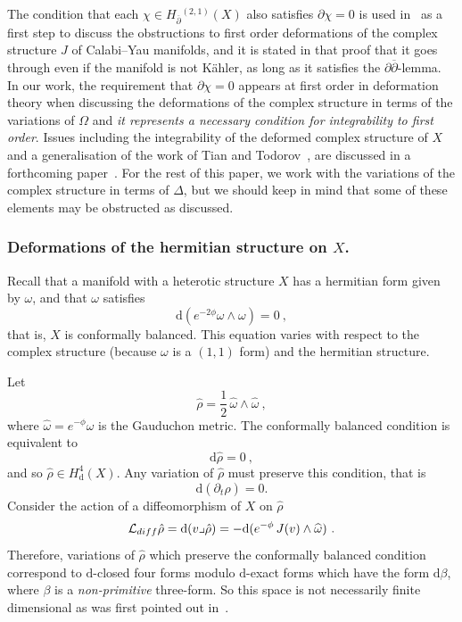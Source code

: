 \documentclass[12pt,a4paper]{article}
\newcommand{\half}{\frac{1}{2}}
\def\bar#1{\overline{#1}}
\let\p=\partial
\def\d{\textrm{d}}
\def\bp{\bar{\partial}}
\theoremstyle{definition}
\begin{document}
The condition that each $\chi\in H_{\bp}{}^{(2,1)}(X)$ also satisfies $\p\chi=0$ is used  in~\citep{MR915841} as a first step to discuss the obstructions to first order deformations of the complex structure $J$ of Calabi--Yau manifolds, and it is stated in that proof that it goes through even if  the manifold is not  K\"ahler, as long as it satisfies the $\p\bp$-lemma.  In our work, the requirement that $\p\chi=0$ appears at first order in deformation theory when discussing the deformations of the complex structure in terms of the variations of $\Omega$ and {\it it represents a necessary condition for integrability to first order}.  Issues including  the integrability of the deformed complex structure of $X$ and a generalisation of the work of Tian and Todorov~\cite{MR915841,MR1027500}, are  discussed in a forthcoming paper~\citep{DKS2014}.  For the rest of this paper, we work with the variations of the complex structure in terms of $\Delta$, but we should keep in mind that some of these elements may be obstructed as discussed.


\subsubsection{Deformations of the hermitian structure on \texorpdfstring{$X$}\ .}
\label{subsubsec:defHS}

Recall that a manifold with a heterotic structure $X$ has a hermitian form given by $\omega$, and that $\omega$ satisfies
\[ \d (e^{-2\phi}\omega\wedge\omega) = 0~,\]
that is, $X$ is conformally balanced.  This equation varies with respect to the complex structure (because $\omega$ is a $(1,1)$ form) and the hermitian structure. 

Let
\[\hat\rho = \half\, \widehat\omega\wedge\widehat\omega~,\]
where $\widehat\omega = e^{-\phi}\omega$ is the Gauduchon metric.
The conformally balanced condition is equivalent to
\[\d \hat\rho = 0~,\]
and so $\hat\rho\in H_\d^4(X)$. Any variation of $\hat\rho$ must preserve this condition, that is
\[ \d (\partial_t\hat\rho) = 0.\]
Consider the action of  a diffeomorphism of $X$ on $\hat\rho$
\[{\cal L}_{diff} \hat\rho = \d (v\lrcorner\hat\rho) = - \d( e^{-\phi} \, J(v)\wedge\widehat\omega)~.\]
Therefore, variations of $\hat\rho$ which preserve the conformally balanced condition correspond to $\d$-closed four forms modulo 
$\d$-exact forms which have the form $\d\beta$, where $\beta$ is a {\it non-primitive} three-form.  So this space is not necessarily finite dimensional as was first pointed out in~\citep{Becker:2006xp}. 
\end{document}
